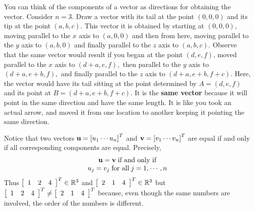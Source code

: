 You can think of the components of a vector as directions for
obtaining the vector. Consider $n=3$.  Draw a vector with its tail at
the point $\left( 0,0,0\right) $ and its tip at the point $\left(
a,b,c\right) $. This vector it is obtained by starting at $\left(
0,0,0\right) $, moving parallel to the $x$ axis to $\left(
a,0,0\right) $ and then from here, moving parallel to the $y$ axis to
$\left( a,b,0\right) $ and finally parallel to the $z$ axis to $\left(
a,b,c\right). $ Observe that the same vector would result if you began
at the point $ \left( d,e,f \right)$, moved parallel to the $x$ axis
to $\left( d+a,e,f\right) ,$ then parallel to the $y$ axis to $\left(
d+a,e+b,f\right) ,$ and finally parallel to the $z$ axis to $\left(
d+a,e+b,f+c\right)$. Here, the vector would have its tail sitting at
the point determined by $A= \left( d,e,f\right) $ and its point at
$B=\left( d+a,e+b,f+c\right) .$ It is the \textbf{same vector} because
it will point in the same direction and have the same length. It is
like you took an actual arrow,  and moved it from one location to another keeping it pointing
the same direction.

Notice that two vectors ${\bf u} = \left[ u_{1} \cdots u_{n}\right]^T $ and
${\bf v}=\left[ v_{1} \cdots v_{n}\right]^T$ are equal if and only if
all corresponding components are equal. Precisely,
\begin{equation*}
\begin{array}{c}
{\bf u}={\bf v} \; \mbox{if and only if}\\
u_{j}=v_{j} \; \mbox{for all}\; j=1,\cdots ,n
\end{array}
\end{equation*} 
Thus 
$\left[ 
\begin{array}{rrr}
1  & 2 & 4
\end{array}
\right]^T \in \mathbb{R}^{3}$ and $\left[ 
\begin{array}{rrr}
2 & 1 & 4
\end{array}
\right]^T \in
\mathbb{R}^{3}$ but $\left[ 
\begin{array}{rrr}
1 & 2 & 4
\end{array}
\right]^T \neq \left[
\begin{array}{rrr}
2 & 1 & 4
\end{array}
\right]^T $ because,
even though the same numbers are involved, the order of the numbers is different. 
